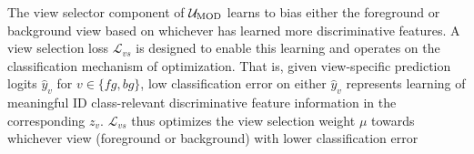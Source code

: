 The view selector component of $\mathcal{U}_{\text{MOD}}$ learns to bias either the foreground or background view based on whichever has learned more discriminative features. A view selection loss $\mathcal{L}_{vs}$ is designed to enable this learning and operates on the classification mechanism of optimization. That is, given view-specific prediction logits $\hat{y}_{v}$ for $v \in \{fg, bg\}$, low classification error on either $\hat{y}_{v}$ represents learning of meaningful ID class-relevant discriminative feature information in the corresponding $z_{v}$. $\mathcal{L}_{vs}$ thus optimizes the view selection weight $\mu$ towards whichever view (foreground or background) with lower classification error
